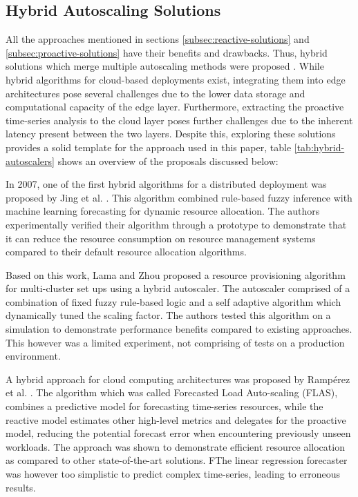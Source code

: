 \subsection{Hybrid Autoscaling Solutions}
\label{subsec:hybrid-solutions}

All the approaches mentioned in sections \ref{subsec:reactive-solutions} and \ref{subsec:proactive-solutions} have their benefits and drawbacks. Thus, hybrid solutions which merge multiple autoscaling methods were proposed \cite{qu2018auto}. While hybrid algorithms for cloud-based deployments exist, integrating them into edge architectures pose several challenges due to the lower data storage and computational capacity of the edge layer. Furthermore, extracting the proactive time-series analysis to the cloud layer poses further challenges due to the inherent latency present between the two layers. Despite this, exploring these solutions provides a solid template for the approach used in this paper, table \ref{tab:hybrid-autoscalers} shows an overview of the proposals discussed below:\par

In 2007, one of the first hybrid algorithms for a distributed deployment was proposed by Jing et al. \cite{xu2007use}. This algorithm combined rule-based fuzzy inference with machine learning forecasting for dynamic resource allocation. The authors experimentally verified their algorithm through a prototype to demonstrate that it can reduce the resource consumption on resource management systems compared to their default resource allocation algorithms.\par

Based on this work, Lama and Zhou \cite{lama2009efficient} proposed a resource provisioning algorithm for multi-cluster set ups using a hybrid autoscaler. The autoscaler comprised of a combination of fixed fuzzy rule-based logic and a self adaptive algorithm which dynamically tuned the scaling factor. The authors tested this algorithm on a simulation to demonstrate performance benefits compared to existing approaches. This however was a limited experiment, not comprising of tests on a production environment.\par

A hybrid approach for cloud computing architectures was proposed by Ramp{\'e}rez et al. \cite{ramperez2021flas}. The algorithm which was called Forecasted Load Auto-scaling (FLAS), combines a predictive model for forecasting time-series resources, while the reactive model estimates other high-level metrics and delegates for the proactive model, reducing the potential forecast error when encountering previously unseen workloads. The approach was shown to demonstrate efficient resource allocation as compared to other state-of-the-art solutions. FThe linear regression forecaster was however too simplistic to predict complex time-series, leading to erroneous results.\par

